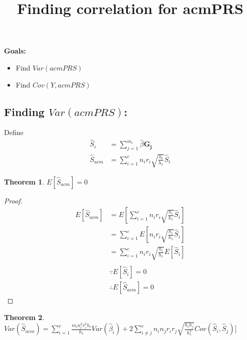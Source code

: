 \documentclass{article}
\newtheorem{theorem}{Theorem}
\begin{document}
\title{Finding correlation for acmPRS}

\maketitle

\textbf{Goals:}

\begin{itemize}
	\item Find $Var(acmPRS)$
	\item Find $Cov(Y, acmPRS)$
\end{itemize}

\subsection{Finding $Var(acmPRS)$:}

Define 
$$ 
\begin{aligned} 
\hat{S}_i &= \sum^{m_i}_{j = 1} \hat{\beta} \mathbf{G_j} \\
\hat{S}_{acm} &= \sum^c_{i=1} n_i r_i \sqrt{\frac{h_i}{h_1}} \hat{S}_i 
\end{aligned} 
$$



\begin{theorem}
$E[\hat{S}_{acm}] = 0$ 
\end{theorem}

\begin{proof}
$$ 
\begin{aligned}
E[\hat{S}_{acm}] &= E[\sum^c_{i=1} n_i r_i \sqrt{\frac{h_i}{h_1}} \hat{S}_i] \\
&= \sum^c_{i=1} E[n_i r_i \sqrt{\frac{h_i}{h_1}} \hat{S}_i] \\
&= \sum^c_{i=1} n_i r_i \sqrt{\frac{h_i}{h_1}} E[\hat{S}_i] \\ \\
&\because E[\hat{S}_i] = 0 \\
&\therefore E[\hat{S}_{acm}] = 0
\end{aligned}
$$
\end{proof}


\begin{theorem}
$Var(\hat{S}_{acm}) =\sum^c_{i=1}  \frac{m_i n^2_i r^2_i h_i}{h_1}  Var(\hat{\beta}_i) + 2 \sum^c_{i \neq j} n_i n_j r_i r_j \sqrt{\frac{h_i h_j}{h^2_1}} Cov(\hat{S}_i, \hat{S}_j)]$
\end{theorem}
\end{document}
